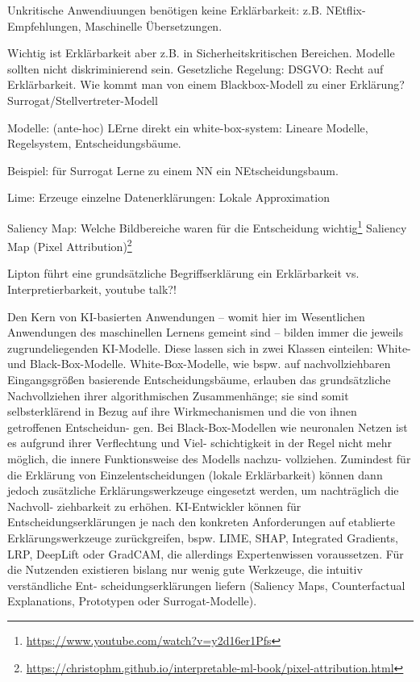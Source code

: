\documentclass[11pt,a4paper]{article}
\numberwithin{equation}{section}
\begin{document}
	
	Unkritische Anwendiuungen benötigen keine Erklärbarkeit: z.B. NEtflix-Empfehlungen, Maschinelle Übersetzungen.
	
	Wichtig ist Erklärbarkeit aber z.B. in Sicherheitskritischen Bereichen. Modelle sollten nicht diskriminierend sein. Gesetzliche Regelung: DSGVO: Recht auf Erklärbarkeit. Wie kommt man von einem Blackbox-Modell zu einer Erklärung? Surrogat/Stellvertreter-Modell
	
	Modelle: (ante-hoc) LErne direkt ein white-box-system: Lineare Modelle, Regelsystem, Entscheidungsbäume.
	
	Beispiel: für Surrogat Lerne zu einem NN ein NEtscheidungsbaum.
	
	Lime: Erzeuge einzelne Datenerklärungen: Lokale Approximation
	
	Saliency Map: Welche Bildbereiche waren für die Entscheidung wichtig\footnote{\url{https://www.youtube.com/watch?v=y2d16er1Pfs}}
	Saliency Map (Pixel Attribution)\footnote{\url{https://christophm.github.io/interpretable-ml-book/pixel-attribution.html}}
	
	Lipton führt eine grundsätzliche Begriffserklärung ein \cite{lipton2018mythos}
	Erklärbarkeit vs. Interpretierbarkeit, youtube talk?!
	
	
	Den Kern von KI-basierten Anwendungen – womit hier im Wesentlichen Anwendungen des
	maschinellen Lernens gemeint sind – bilden immer die jeweils zugrundeliegenden KI-Modelle.
	Diese lassen sich in zwei Klassen einteilen: White- und Black-Box-Modelle. White-Box-Modelle,
	wie bspw. auf nachvollziehbaren Eingangsgrößen basierende Entscheidungsbäume, erlauben
	das grundsätzliche Nachvollziehen ihrer algorithmischen Zusammenhänge; sie sind somit
	selbsterklärend in Bezug auf ihre Wirkmechanismen und die von ihnen getroffenen Entscheidun-
	gen. Bei Black-Box-Modellen wie neuronalen Netzen ist es aufgrund ihrer Verflechtung und Viel-
	schichtigkeit in der Regel nicht mehr möglich, die innere Funktionsweise des Modells nachzu-
	vollziehen. Zumindest für die Erklärung von Einzelentscheidungen (lokale Erklärbarkeit) können
	dann jedoch zusätzliche Erklärungswerkzeuge eingesetzt werden, um nachträglich die Nachvoll-
	ziehbarkeit zu erhöhen. KI-Entwickler können für Entscheidungserklärungen je nach den
	konkreten Anforderungen auf etablierte Erklärungswerkzeuge zurückgreifen, bspw. LIME, SHAP,
	Integrated Gradients, LRP, DeepLift oder GradCAM, die allerdings Expertenwissen voraussetzen.
	Für die Nutzenden existieren bislang nur wenig gute Werkzeuge, die intuitiv verständliche Ent-
	scheidungserklärungen liefern (Saliency Maps, Counterfactual Explanations, Prototypen oder
	Surrogat-Modelle).
	
\end{document}
